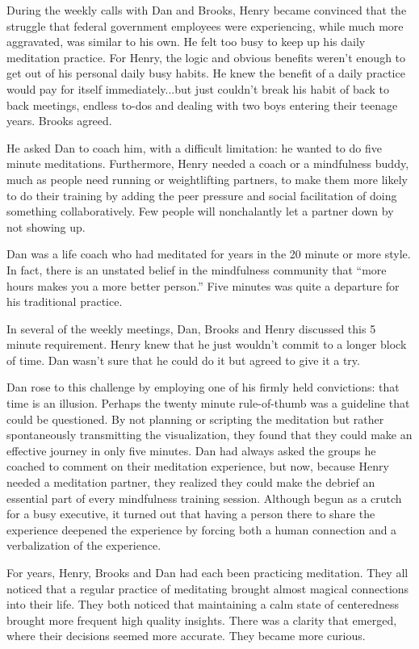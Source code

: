 \documentclass[12pt]{book}
\begin{document}
During the weekly calls with Dan and Brooks, Henry became convinced
that the struggle that federal government employees were experiencing,
while much more aggravated, was similar to his own. He felt too busy
to keep up his daily meditation practice. For Henry, the logic and
obvious benefits weren't enough to get out of his personal daily busy
habits. He knew the benefit of a daily practice would pay for itself
immediately...but just couldn't break his habit of back to back
meetings, endless to-dos and dealing with two boys entering their
teenage years. Brooks agreed.
					
He asked Dan to coach him, with a difficult limitation: he wanted to
do five minute meditations. Furthermore, Henry needed a coach or a
mindfulness buddy, much as people need running or weightlifting
partners, to make them more likely to do their training by adding the
peer pressure and social facilitation of doing something
collaboratively. Few people will nonchalantly let a partner down by
not showing up.
					
Dan was a life coach who had meditated for years in the 20 minute or
more style. In fact, there is an unstated belief in the mindfulness
community that “more hours makes you a more better person.” Five
minutes was quite a departure for his traditional practice.
					
In several of the weekly meetings, Dan, Brooks and Henry discussed
this 5 minute requirement. Henry knew that he just wouldn't commit to
a longer block of time. Dan wasn't sure that he could do it but agreed
to give it a try.
					
Dan rose to this challenge by employing one of his firmly held
convictions: that time is an illusion. Perhaps the twenty minute
rule-of-thumb was a guideline that could be questioned. By not
planning or scripting the meditation but rather spontaneously
transmitting the visualization, they found that they could make an
effective journey in only five minutes. Dan had always asked the
groups he coached to comment on their meditation experience, but now,
because Henry needed a meditation partner, they realized they could
make the debrief an essential part of every mindfulness training
session. Although begun as a crutch for a busy executive, it turned
out that having a person there to share the experience deepened the
experience by forcing both a human connection and a verbalization of
the experience.
					
For years, Henry, Brooks and Dan had each been practicing
meditation. They all noticed that a regular practice of meditating
brought almost magical connections into their life. They both noticed
that maintaining a calm state of centeredness brought more frequent
high quality insights. There was a clarity that emerged, where their
decisions seemed more accurate. They became more curious.
\end{document}
